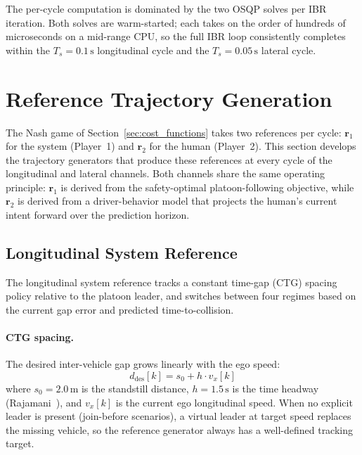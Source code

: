 \documentclass[12pt,a4paper,oneside]{report}
\begin{document}
The per-cycle computation is dominated by the two OSQP solves per IBR iteration. Both solves are warm-started; each takes on the order of hundreds of microseconds on a mid-range CPU, so the full IBR loop consistently completes within the $T_s = 0.1\,\mathrm{s}$ longitudinal cycle and the $T_s = 0.05\,\mathrm{s}$ lateral cycle.

\section{Reference Trajectory Generation}
\label{sec:reference_generation}

The Nash game of Section~\ref{sec:cost_functions} takes two references per cycle: $\mathbf{r}_1$ for the system (Player~1) and $\mathbf{r}_2$ for the human (Player~2). This section develops the trajectory generators that produce these references at every cycle of the longitudinal and lateral channels. Both channels share the same operating principle: $\mathbf{r}_1$ is derived from the safety-optimal platoon-following objective, while $\mathbf{r}_2$ is derived from a driver-behavior model that projects the human's current intent forward over the prediction horizon.

\subsection{Longitudinal System Reference}
\label{sec:long_sys_ref}

The longitudinal system reference tracks a constant time-gap (CTG) spacing policy relative to the platoon leader, and switches between four regimes based on the current gap error and predicted time-to-collision.

\paragraph{CTG spacing.} The desired inter-vehicle gap grows linearly with the ego speed:
\begin{equation}
d_{\text{des}}[k] = s_0 + h \cdot v_x[k]
\label{eq:ctg_spacing}
\end{equation}
where $s_0 = 2.0\,\mathrm{m}$ is the standstill distance, $h = 1.5\,\mathrm{s}$ is the time headway (Rajamani~\cite{rajamaniVehicleDynamicsControl2005}), and $v_x[k]$ is the current ego longitudinal speed. When no explicit leader is present (join-before scenarios), a virtual leader at target speed replaces the missing vehicle, so the reference generator always has a well-defined tracking target.
\end{document}
